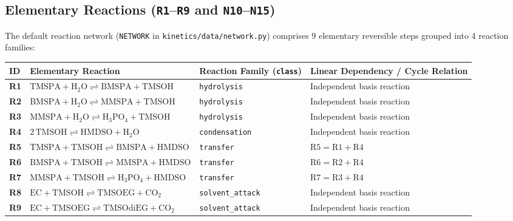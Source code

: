 \documentclass[11pt,a4paper]{article}
\begin{document}
\clearpage
\subsection{Elementary Reactions (\texttt{R1}--\texttt{R9} and \texttt{N10}--\texttt{N15})}

The default reaction network (\texttt{NETWORK} in \texttt{kinetics/\allowbreak{}data/\allowbreak{}network.py}) comprises 9 elementary reversible steps grouped into 4 reaction families:

\begin{tabularx}{\textwidth}{L{1.0cm} Y L{3.0cm} L{4.2cm}}
\toprule
\textbf{ID} & \textbf{Elementary Reaction} & \textbf{Reaction Family (\texttt{class})} & \textbf{Linear Dependency / Cycle Relation} \\
\midrule
\textbf{R1} & $\text{TMSPA} + \text{H}_2\text{O} \rightleftharpoons \text{BMSPA} + \text{TMSOH}$ & \texttt{hydrolysis} & Independent basis reaction \\
\textbf{R2} & $\text{BMSPA} + \text{H}_2\text{O} \rightleftharpoons \text{MMSPA} + \text{TMSOH}$ & \texttt{hydrolysis} & Independent basis reaction \\
\textbf{R3} & $\text{MMSPA} + \text{H}_2\text{O} \rightleftharpoons \text{H}_3\text{PO}_4 + \text{TMSOH}$ & \texttt{hydrolysis} & Independent basis reaction \\
\textbf{R4} & $2\,\text{TMSOH} \rightleftharpoons \text{HMDSO} + \text{H}_2\text{O}$ & \texttt{condensation} & Independent basis reaction \\
\textbf{R5} & $\text{TMSPA} + \text{TMSOH} \rightleftharpoons \text{BMSPA} + \text{HMDSO}$ & \texttt{transfer} & $\text{R5} = \text{R1} + \text{R4}$ \\
\textbf{R6} & $\text{BMSPA} + \text{TMSOH} \rightleftharpoons \text{MMSPA} + \text{HMDSO}$ & \texttt{transfer} & $\text{R6} = \text{R2} + \text{R4}$ \\
\textbf{R7} & $\text{MMSPA} + \text{TMSOH} \rightleftharpoons \text{H}_3\text{PO}_4 + \text{HMDSO}$ & \texttt{transfer} & $\text{R7} = \text{R3} + \text{R4}$ \\
\textbf{R8} & $\text{EC} + \text{TMSOH} \rightleftharpoons \text{TMSOEG} + \text{CO}_2$ & \texttt{solvent\_\allowbreak{}attack} & Independent basis reaction \\
\textbf{R9} & $\text{EC} + \text{TMSOEG} \rightleftharpoons \text{TMSOdiEG} + \text{CO}_2$ & \texttt{solvent\_\allowbreak{}attack} & Independent basis reaction \\
\bottomrule
\end{tabularx}
\end{document}
